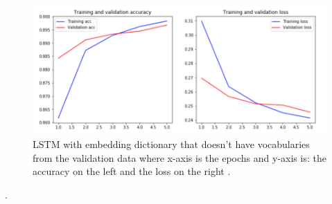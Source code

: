 \begin{figure}[h!]
  \includegraphics[width=\linewidth]{vocabChange.png}
  \caption{LSTM with embedding dictionary that doesn't have vocabularies from the validation data where x-axis is the epochs and y-axis is: the accuracy on the left and the loss on the right .}
  \label{fig:lstmvoc}
\end{figure} . 
